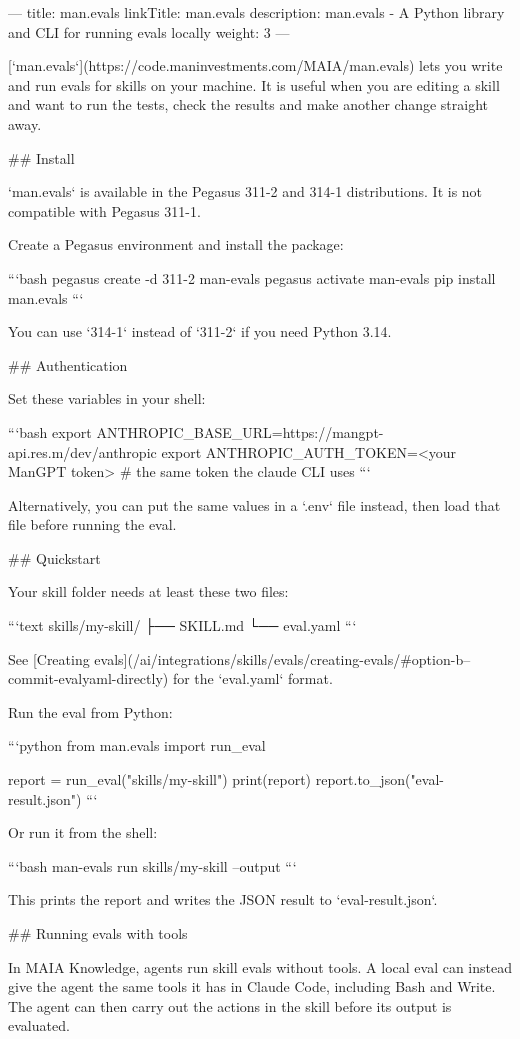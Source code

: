---
title: man.evals
linkTitle: man.evals
description: man.evals - A Python library and CLI for running evals locally
weight: 3
---

[`man.evals`](https://code.maninvestments.com/MAIA/man.evals) lets you write and run evals for skills on your machine.
It is useful when you are editing a skill and want to run the tests, check the results and make another change straight away.

## Install

`man.evals` is available in the Pegasus 311-2 and 314-1 distributions.
It is not compatible with Pegasus 311-1.

Create a Pegasus environment and install the package:

```bash
pegasus create -d 311-2 man-evals
pegasus activate man-evals
pip install man.evals
```

You can use `314-1` instead of `311-2` if you need Python 3.14.

## Authentication

Set these variables in your shell:

```bash
export ANTHROPIC_BASE_URL=https://mangpt-api.res.m/dev/anthropic
export ANTHROPIC_AUTH_TOKEN=<your ManGPT token>    # the same token the claude CLI uses
```

Alternatively, you can put the same values in a `.env` file instead, then load that file before running the eval.

## Quickstart

Your skill folder needs at least these two files:

```text
skills/my-skill/
├── SKILL.md
└── eval.yaml
```

See [Creating evals](/ai/integrations/skills/evals/creating-evals/#option-b--commit-evalyaml-directly) for the `eval.yaml` format.

Run the eval from Python:

```python
from man.evals import run_eval

report = run_eval("skills/my-skill")
print(report)
report.to_json("eval-result.json")
```

Or run it from the shell:

```bash
man-evals run skills/my-skill --output
```

This prints the report and writes the JSON result to `eval-result.json`.

## Running evals with tools

In MAIA Knowledge, agents run skill evals without tools.
A local eval can instead give the agent the same tools it has in Claude Code, including Bash and Write.
The agent can then carry out the actions in the skill before its output is evaluated.

